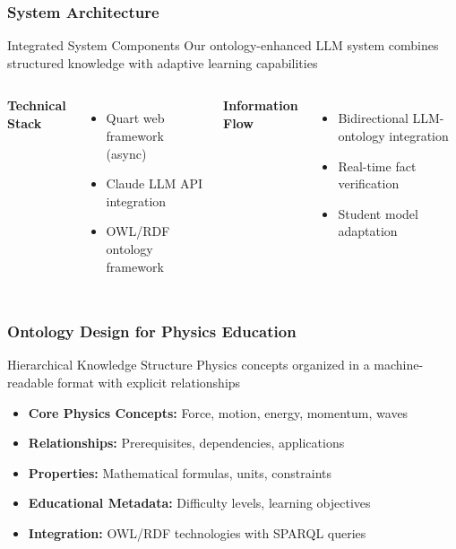 \documentclass{beamer}
\begin{document}
\begin{frame}
\frametitle{System Architecture}

\begin{block}{Integrated System Components}
Our ontology-enhanced LLM system combines structured knowledge with adaptive learning capabilities
\end{block}


\begin{columns}
\textbf{Technical Stack}
\begin{itemize}
    \item Quart web framework (async)
    \item Claude LLM API integration
    \item OWL/RDF ontology framework
\end{itemize}

\textbf{Information Flow}
\begin{itemize}
    \item Bidirectional LLM-ontology integration
    \item Real-time fact verification
    \item Student model adaptation
\end{itemize}
\end{columns}
\end{frame}

\begin{frame}
\frametitle{Ontology Design for Physics Education}

\begin{alertblock}{Hierarchical Knowledge Structure}
Physics concepts organized in a machine-readable format with explicit relationships
\end{alertblock}

\begin{itemize}
    \item<1-> \textbf{Core Physics Concepts:} Force, motion, energy, momentum, waves
    \item<2-> \textbf{Relationships:} Prerequisites, dependencies, applications
    \item<3-> \textbf{Properties:} Mathematical formulas, units, constraints
    \item<4-> \textbf{Educational Metadata:} Difficulty levels, learning objectives
    \item<5-> \textbf{Integration:} OWL/RDF technologies with SPARQL queries
\end{itemize}
\end{frame}
\end{document}
